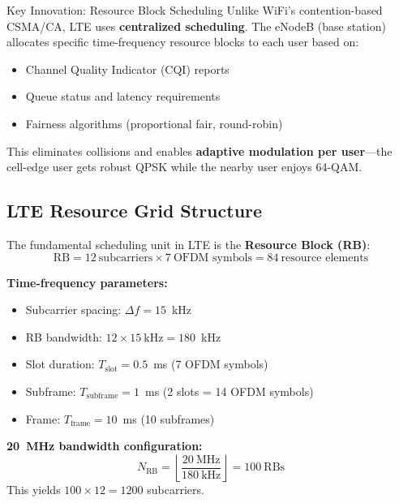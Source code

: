 \begin{calloutbox}[colback=green!5!white,colframe=green!75!black]{Key Innovation: Resource Block Scheduling}
Unlike WiFi's contention-based CSMA/CA, LTE uses \textbf{centralized scheduling}. The eNodeB (base station) allocates specific time-frequency resource blocks to each user based on:
\begin{itemize}
\item Channel Quality Indicator (CQI) reports
\item Queue status and latency requirements
\item Fairness algorithms (proportional fair, round-robin)
\end{itemize}

This eliminates collisions and enables \textbf{adaptive modulation per user}---the cell-edge user gets robust QPSK while the nearby user enjoys 64-QAM.
\end{calloutbox}

\subsection{LTE Resource Grid Structure}

The fundamental scheduling unit in LTE is the \textbf{Resource Block (RB)}:
\begin{equation}
\text{RB} = 12~\text{subcarriers} \times 7~\text{OFDM symbols} = 84~\text{resource elements}
\end{equation}

\textbf{Time-frequency parameters:}
\begin{itemize}
\item Subcarrier spacing: $\Delta f = 15$~kHz
\item RB bandwidth: $12 \times 15~\text{kHz} = 180$~kHz
\item Slot duration: $T_{\text{slot}} = 0.5$~ms (7 OFDM symbols)
\item Subframe: $T_{\text{subframe}} = 1$~ms (2 slots = 14 OFDM symbols)
\item Frame: $T_{\text{frame}} = 10$~ms (10 subframes)
\end{itemize}

\textbf{20~MHz bandwidth configuration:}
\begin{equation}
N_{\text{RB}} = \left\lfloor \frac{20~\text{MHz}}{180~\text{kHz}} \right\rfloor = 100~\text{RBs}
\end{equation}
This yields $100 \times 12 = 1200$ subcarriers.

